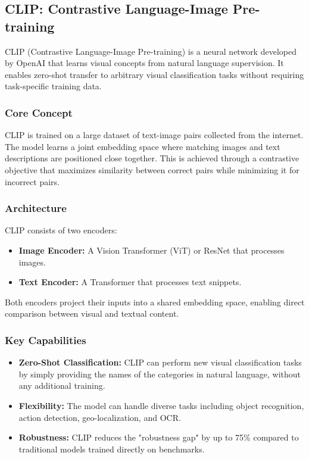 \documentclass[12pt,a4paper,oneside,english]{book}
\begin{document}
\subsection{CLIP: Contrastive Language-Image Pre-training}
\label{subsec:clip}

CLIP (Contrastive Language-Image Pre-training) is a neural network developed by OpenAI that learns visual concepts from natural language supervision. It enables zero-shot transfer to arbitrary visual classification tasks without requiring task-specific training data.

\subsubsection{Core Concept}
CLIP is trained on a large dataset of text-image pairs collected from the internet. The model learns a joint embedding space where matching images and text descriptions are positioned close together. This is achieved through a contrastive objective that maximizes similarity between correct pairs while minimizing it for incorrect pairs.

\subsubsection{Architecture}
CLIP consists of two encoders:
\begin{itemize}
    \item \textbf{Image Encoder:} A Vision Transformer (ViT) or ResNet that processes images.
    \item \textbf{Text Encoder:} A Transformer that processes text snippets.
\end{itemize}
Both encoders project their inputs into a shared embedding space, enabling direct comparison between visual and textual content.

\subsubsection{Key Capabilities}
\begin{itemize}
    \item \textbf{Zero-Shot Classification:} CLIP can perform new visual classification tasks by simply providing the names of the categories in natural language, without any additional training.
    \item \textbf{Flexibility:} The model can handle diverse tasks including object recognition, action detection, geo-localization, and OCR.
    \item \textbf{Robustness:} CLIP reduces the "robustness gap" by up to 75\% compared to traditional models trained directly on benchmarks.
\end{itemize}
\end{document}
